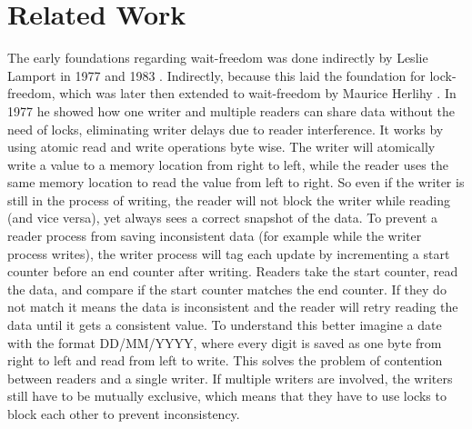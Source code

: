 \chapter{Related Work}

The early foundations regarding wait-freedom was done indirectly by Leslie Lamport in 1977 and 1983 \cite{Lamport1977ConcurrentReading,Lamport1983SPSCCircularBuffer}. Indirectly, because this laid the foundation for lock-freedom, which was later then extended to wait-freedom by Maurice Herlihy \cite{herlihy1991wait}. In 1977 he showed how one writer and multiple readers can share data without the need of locks, eliminating writer delays due to reader interference. It works by using atomic read and write operations byte wise. The writer will atomically write a value to a memory location from right to left, while the reader uses the same memory location to read the value from left to right. So even if the writer is still in the process of writing, the reader will not block the writer while reading (and vice versa), yet always sees a correct snapshot of the data. To prevent a reader process from saving inconsistent data (for example while the writer process writes), the writer process will tag each update by incrementing a start counter before an end counter after writing. Readers take the start counter, read the data, and compare if the start counter matches the end counter. If they do not match it means the data is inconsistent and the reader will retry reading the data until it gets a consistent value. To understand this better imagine a date with the format DD/MM/YYYY, where every digit is saved as one byte from right to left and read from left to write. This solves the problem of contention between readers and a single writer. If multiple writers are involved, the writers still have to be mutually exclusive, which means that they have to use locks to block each other to prevent inconsistency. \cite{Lamport1977ConcurrentReading} 


